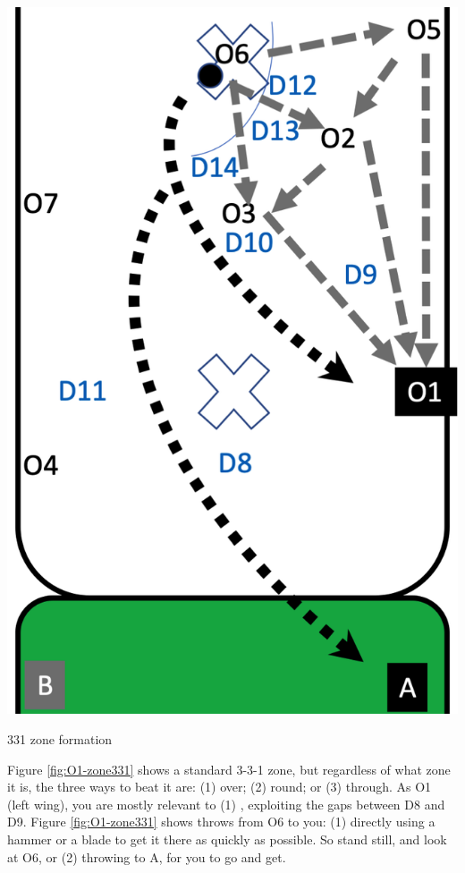 \documentclass{tufte-handout}
\begin{document}
\begin{marginfigure}%
  \includegraphics[width=\linewidth]{O1-zone331}
  \caption{331 zone formation}
  \label{fig:O1-zone331}
\end{marginfigure}

Figure \ref{fig:O1-zone331}
shows a standard 
3-3-1 zone, but
regardless of what zone it is,
the three ways to beat it are:
(1) over;
(2) round; or
(3) through. 
As O1 
(left wing), 
you are mostly relevant to 
(1) , 
exploiting the gaps between 
D8 
and D9.
Figure \ref{fig:O1-zone331} shows 
throws from O6 to you:
(1) directly 
using a hammer
or a blade 
to get it there
as quickly as possible.
So stand still, 
and look at O6, or
(2) throwing to A, 
for you to go and get. 
\end{document}
